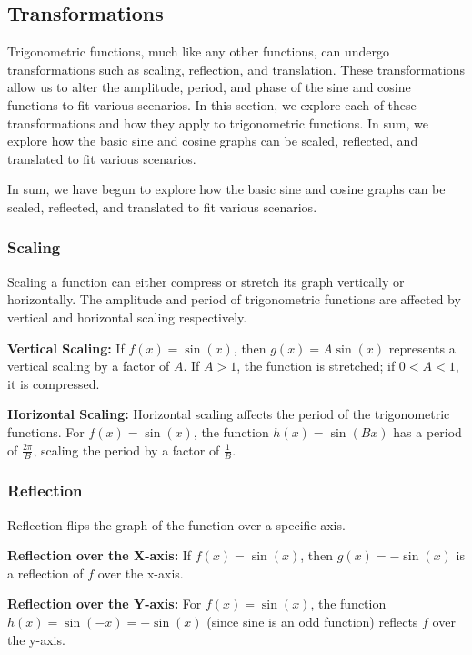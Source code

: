 \documentclass[a4paper,12pt]{book}
\begin{document}

\subsection{Transformations}
\label{subsec:transformations}

Trigonometric functions, much like any other functions, can undergo transformations such as scaling, reflection, and translation. These transformations allow us to alter the amplitude, period, and phase of the sine and cosine functions to fit various scenarios. In this section, we explore each of these transformations and how they apply to trigonometric functions. In sum, we explore how the basic sine and cosine graphs can be scaled, reflected, and translated to fit various scenarios.

In sum, we have begun to explore how the basic sine and cosine graphs can be scaled, reflected, and translated to fit various scenarios.

\subsubsection{Scaling}
Scaling a function can either compress or stretch its graph vertically or horizontally. The amplitude and period of trigonometric functions are affected by vertical and horizontal scaling respectively.

\textbf{Vertical Scaling:} If \( f(x) = \sin(x) \), then \( g(x) = A\sin(x) \) represents a vertical scaling by a factor of \( A \). If \( A > 1 \), the function is stretched; if \( 0 < A < 1 \), it is compressed.

\textbf{Horizontal Scaling:} Horizontal scaling affects the period of the trigonometric functions. For \( f(x) = \sin(x) \), the function \( h(x) = \sin(Bx) \) has a period of \( \frac{2\pi}{B} \), scaling the period by a factor of \( \frac{1}{B} \).

\subsubsection{Reflection}
Reflection flips the graph of the function over a specific axis. 

\textbf{Reflection over the X-axis:} If \( f(x) = \sin(x) \), then \( g(x) = -\sin(x) \) is a reflection of \( f \) over the x-axis.

\textbf{Reflection over the Y-axis:} For \( f(x) = \sin(x) \), the function \( h(x) = \sin(-x) = -\sin(x) \) (since sine is an odd function) reflects \( f \) over the y-axis.
\end{document}
